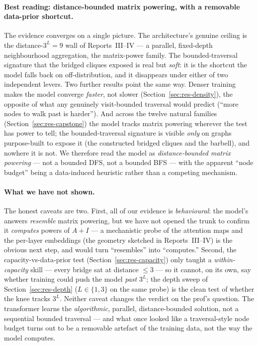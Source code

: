 \documentclass[11pt,a4paper]{article}
\begin{document}
\paragraph{Best reading: distance-bounded matrix powering, with a removable data-prior shortcut.} The
evidence converges on a single picture. The architecture's genuine ceiling is the distance-$3^L=9$
wall of Reports~III--IV --- a parallel, fixed-depth neighbourhood aggregation, the matrix-power
family. The bounded-traversal signature that the bridged cliques exposed is real but \emph{soft}: it
is the shortcut the model falls back on off-distribution, and it disappears under either of two
independent levers. Two further results point the same way. Denser training makes the model converge
\emph{faster}, not slower (Section~\ref{sec:res-density}), the opposite of what any genuinely
visit-bounded traversal would predict (``more nodes to walk past is harder''). And across the twelve
natural families (Section~\ref{sec:res-capstone}) the model tracks matrix powering wherever the test
has power to tell; the bounded-traversal signature is visible \emph{only} on graphs purpose-built to
expose it (the constructed bridged cliques and the barbell), and nowhere it is not. We therefore read
the model as \emph{distance-bounded matrix powering} --- not a bounded DFS, not a bounded BFS --- with
the apparent ``node budget'' being a data-induced heuristic rather than a competing mechanism.

\paragraph{What we have not shown.} The honest caveats are two. First, all of our evidence is
\emph{behavioural}: the model's answers \emph{resemble} matrix powering, but we have not opened the
trunk to confirm it \emph{computes} powers of $A+I$ --- a mechanistic probe of the attention maps and
the per-layer embeddings (the geometry sketched in Reports~III--IV) is the obvious next step, and
would turn ``resembles'' into ``computes.'' Second, the capacity-vs-data-prior test
(Section~\ref{sec:res-capacity}) only taught a \emph{within-capacity} skill --- every bridge sat at
distance $\le3$ --- so it cannot, on its own, say whether training could push the model \emph{past}
$3^L$; the depth sweep of Section~\ref{sec:res-depth} ($L\in\{1,3\}$ on the same probe) is the
clean test of whether the knee tracks $3^L$. Neither caveat changes the verdict on the prof's
question. The transformer learns the \emph{algorithmic}, parallel, distance-bounded solution, not a
sequential bounded traversal --- and what once looked like a traversal-style node budget turns out to
be a removable artefact of the training data, not the way the model computes.
\end{document}
